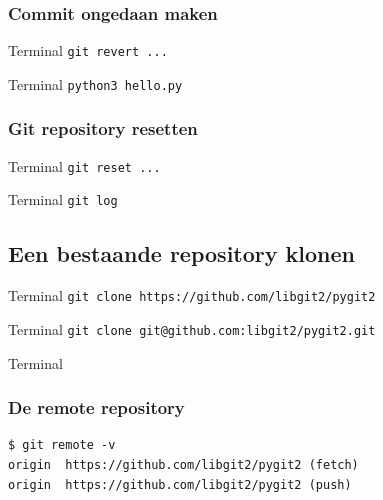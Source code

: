 \documentclass[]{beamer}
\begin{document}
\begin{frame}[fragile]
    \frametitle{Commit ongedaan maken}

    \begin{block}{Terminal}
    \verb/git revert .../
    \end{block}

    \pause

    \begin{block}{Terminal}
    \verb/python3 hello.py/
    \end{block}
\end{frame}

\begin{frame}[fragile]
    \frametitle{Git repository resetten}

    \begin{block}{Terminal}
    \verb/git reset .../
    \end{block}

    \pause

    \begin{block}{Terminal}
    \verb/git log/
    \end{block}
\end{frame}

\subsection{Een bestaande repository klonen}

\begin{frame}[fragile]
    \begin{block}{Terminal}
    \verb$git clone https://github.com/libgit2/pygit2$
    \end{block}

    \pause

    \begin{block}{Terminal}
    \verb$git clone git@github.com:libgit2/pygit2.git$
    \end{block}
\end{frame}

\begin{frame}[fragile]
    \begin{block}{Terminal}
    \frametitle{De remote repository}

\begin{Verbatim}[fontsize=\scriptsize]
$ git remote -v
origin  https://github.com/libgit2/pygit2 (fetch)
origin  https://github.com/libgit2/pygit2 (push)
\end{Verbatim}
    \end{block}
\end{frame}
\end{document}

